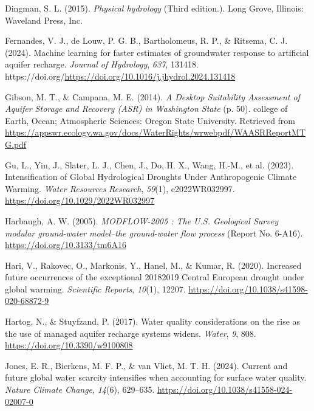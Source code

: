 \documentclass[
]{agujournal2019}
\newlength{\cslhangindent}
\newenvironment{CSLReferences}[2] %
 {\begin{list}{}{%
  \setlength{\itemindent}{0pt}
  \setlength{\leftmargin}{0pt}
  \setlength{\parsep}{0pt}
  \ifodd #1
   \setlength{\leftmargin}{\cslhangindent}
   \setlength{\itemindent}{-1\cslhangindent}
  \fi
  \setlength{\itemsep}{#2\baselineskip}}}
 {\end{list}}
\begin{document}
\begin{CSLReferences}{1}{0}
Dingman, S. L. (2015). \emph{Physical hydrology} (Third edition.). Long
Grove, Illinois: Waveland Press, Inc.

Fernandes, V. J., de Louw, P. G. B., Bartholomeus, R. P., \& Ritsema, C.
J. (2024). Machine learning for faster estimates of groundwater response
to artificial aquifer recharge. \emph{Journal of Hydrology}, \emph{637},
131418.
https://doi.org/\url{https://doi.org/10.1016/j.jhydrol.2024.131418}

Gibson, M. T., \& Campana, M. E. (2014). \emph{A {Desktop} {Suitability}
{Assessment} of {Aquifer} {Storage} and {Recovery} ({ASR}) in
{Washington} {State}} (p. 50). college of Earth, Ocean; Atmospheric
Sciences: Oregon State University. Retrieved from
\url{https://appswr.ecology.wa.gov/docs/WaterRights/wrwebpdf/WAASRReportMTG.pdf}

Gu, L., Yin, J., Slater, L. J., Chen, J., Do, H. X., Wang, H.-M., et al.
(2023). Intensification of Global Hydrological Droughts Under
Anthropogenic Climate Warming. \emph{Water Resources Research},
\emph{59}(1), e2022WR032997. \url{https://doi.org/10.1029/2022WR032997}

Harbaugh, A. W. (2005). \emph{{MODFLOW}-2005 : The {U}.{S}. {Geological}
{Survey} modular ground-water model--the ground-water flow process}
(Report No. 6-A16). \url{https://doi.org/10.3133/tm6A16}

Hari, V., Rakovec, O., Markonis, Y., Hanel, M., \& Kumar, R. (2020).
Increased future occurrences of the exceptional 2018{\textendash}2019
Central European drought under global warming. \emph{Scientific
Reports}, \emph{10}(1), 12207.
\url{https://doi.org/10.1038/s41598-020-68872-9}

Hartog, N., \& Stuyfzand, P. (2017). Water quality considerations on the
rise as the use of managed aquifer recharge systems widens.
\emph{Water}, \emph{9}, 808. \url{https://doi.org/10.3390/w9100808}

Jones, E. R., Bierkens, M. F. P., \& van Vliet, M. T. H. (2024). Current
and future global water scarcity intensifies when accounting for surface
water quality. \emph{Nature Climate Change}, \emph{14}(6), 629--635.
\url{https://doi.org/10.1038/s41558-024-02007-0}


\end{CSLReferences}
\end{document}
